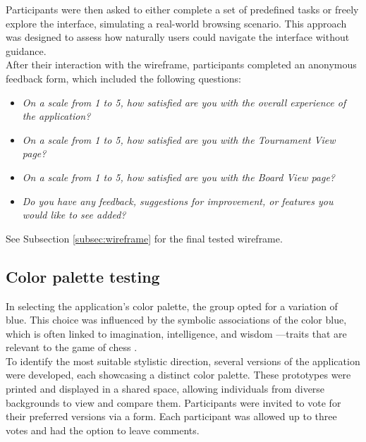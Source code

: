Participants were then asked to either complete a set of predefined tasks or freely explore the interface, simulating a real-world browsing scenario. This approach was designed to assess how naturally users could navigate the interface without guidance. \\

After their interaction with the wireframe, participants completed an anonymous feedback form, which included the following questions:

\begin{itemize}
    \item \textit{On a scale from 1 to 5, how satisfied are you with the overall experience of the application?}
    \item \textit{On a scale from 1 to 5, how satisfied are you with the Tournament View page?}
    \item \textit{On a scale from 1 to 5, how satisfied are you with the Board View page?}
    \item \textit{Do you have any feedback, suggestions for improvement, or features you would like to see added?}
\end{itemize}

See Subsection \ref{subsec:wireframe} for the final tested wireframe.



\subsection{Color palette testing}
\label{subsubsec:color-palette}

In selecting the application’s color palette, the group opted for a variation of blue. This choice was influenced by the symbolic associations of the color blue, which is often linked to imagination, intelligence, and wisdom \cite{blue}—traits that are relevant to the game of chess \cite{chess:ppqty, chess:chess-and-creativity}. \\

To identify the most suitable stylistic direction, several versions of the application were developed, each showcasing a distinct color palette. These prototypes were printed and displayed in a shared space, allowing individuals from diverse backgrounds to view and compare them. Participants were invited to vote for their preferred versions via a form. Each participant was allowed up to three votes and had the option to leave comments.